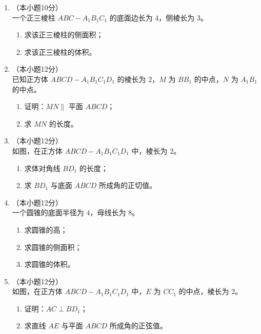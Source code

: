 \documentclass[12pt, a4paper]{ctexart}
\begin{document}
\begin{enumerate}[resume]
\item[17.]（本小题10分）\\
一个正三棱柱 $ABC-A_1B_1C_1$ 的底面边长为 $4$，侧棱长为 $3$。
\begin{enumerate}[(1)]
  \item 求该正三棱柱的侧面积；
  \item 求该正三棱柱的体积。
\end{enumerate}

\vspace{6cm}

\item[18.]（本小题12分）\\
已知正方体 $ABCD-A_1B_1C_1D_1$ 的棱长为 $2$，$M$ 为 $BB_1$ 的中点，$N$ 为 $A_1B_1$ 的中点。
\begin{enumerate}[(1)]
  \item 证明：$MN\parallel$ 平面 $ABCD$；
  \item 求 $MN$ 的长度。
\end{enumerate}

\vspace{6cm}

\item[19.]（本小题12分）\\
如图，在正方体 $ABCD-A_1B_1C_1D_1$ 中，棱长为 $2$。
\begin{enumerate}[(1)]
  \item 求体对角线 $BD_1$ 的长度；
  \item 求 $BD_1$ 与底面 $ABCD$ 所成角的正切值。
\end{enumerate}

\vspace{6cm}

\item[20.]（本小题12分）\\
一个圆锥的底面半径为 $4$，母线长为 $8$。
\begin{enumerate}[(1)]
  \item 求圆锥的高；
  \item 求圆锥的侧面积；
  \item 求圆锥的体积。
\end{enumerate}

\vspace{6cm}

\item[21.]（本小题12分）\\
如图，在正方体 $ABCD-A_1B_1C_1D_1$ 中，$E$ 为 $CC_1$ 的中点，棱长为 $2$。
\begin{enumerate}[(1)]
  \item 证明：$AC\perp BD_1$；
  \item 求直线 $AE$ 与平面 $ABCD$ 所成角的正弦值。
\end{enumerate}


\end{enumerate}
\end{document}
